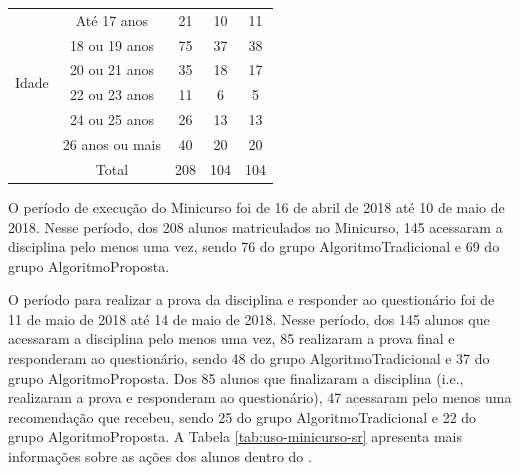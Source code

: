 \begin{table}[h]
\begin{tabular}{|c|c|c|c|c|}
  \multirow{6}{*}{Idade}                & Até 17 anos      & 21                                  & 10                   & 11                               \\
                                        & 18 ou 19 anos    & 75                                  & 37                   & 38                               \\
                                        & 20 ou 21 anos    & 35                                  & 18                   & 17                               \\
                                        & 22 ou 23 anos    & 11                                  & 6                    & 5                                \\
                                        & 24 ou 25 anos    & 26                                  & 13                   & 13                               \\
                                        & 26 anos ou mais  & 40                                  & 20                   & 20                               \\ \hline
                                        & Total            & 208                                 & 104                  & 104                              \\ \hline
\end{tabular}
\end{table}

O período de execução do Minicurso foi de 16 de abril de 2018 até 10 de maio de 2018. Nesse período, dos 208 alunos
matriculados no Minicurso, 145 acessaram a disciplina pelo menos uma vez, sendo 76 do grupo AlgoritmoTradicional e 69
do grupo AlgoritmoProposta.

O período para realizar a prova da disciplina e responder ao questionário foi de 11 de maio de 2018 até
14 de maio de 2018. Nesse período, dos 145 alunos que acessaram a disciplina pelo menos uma vez, 85 realizaram a prova final e responderam ao
questionário, sendo 48 do grupo AlgoritmoTradicional e 37 do grupo AlgoritmoProposta. Dos 85 alunos que finalizaram a
disciplina (i.e., realizaram a prova e responderam ao questionário), 47 acessaram pelo menos uma recomendação que
recebeu, sendo 25 do grupo AlgoritmoTradicional e 22 do grupo AlgoritmoProposta. A Tabela \ref{tab:uso-minicurso-sr}
apresenta mais informações sobre as ações dos alunos dentro do \adaptweb.

